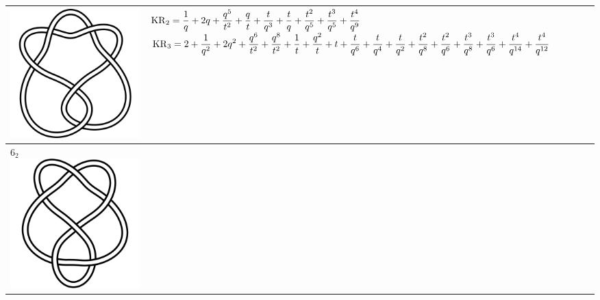 \documentclass{compositio}
\theoremstyle{definition}
\numberwithin{equation}{section}
\begin{document}
{\begin{longtable}{p{}|p{}}
\includegraphics[scale=0.07,angle=0]{knot6_1.pdf} 
&
\newline 
$
\displaystyle{%
\KR_{2} = \frac{1}{q}+2 q+\frac{q^5}{t^2}+\frac{q}{t}+\frac{t}{q^3}+\frac{t}{q}+\frac{t^2}{q^5}+\frac{t^3}{q^5}+\frac{t^4}{q^9}
}
$
\newline 
$
\displaystyle{%
\KR_{3} = 2+\frac{1}{q^2}+2 q^2+\frac{q^6}{t^2}+\frac{q^8}{t^2}+\frac{1}{t}+\frac{q^2}{t}+t+\frac{t}{q^6}+\frac{t}{q^4}+\frac{t}{q^2}+\frac{t^2}{q^8}+\frac{t^2}{q^6}+\frac{t^3}{q^8}+\frac{t^3}{q^6}+\frac{t^4}{q^{14}}+\frac{t^4}{q^{12}}
}
$
\newline
\\
\hline
$6_{2}$ 
\includegraphics[scale=0.07,angle=0]{knot6_2.pdf} 

\end{longtable}}
\end{document}
